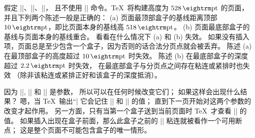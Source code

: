 \ddangerexercise 假定 |\vsize=528pt|、|\maxdepth=2.2pt|、|\topskip=10pt|，
且不使用 |\insert| 命令。\TeX\ 将构建高度为 $528\pt$ 的页面，
并且下列两个陈述一般是正确的：
(a) 页面最顶部盒子的基线距离顶部 $10\pt$，即比页面本身的基线高 $518\pt$。%
(b) 页面最底部盒子的基线与页面本身的基线重合。%
看看在什么情况下 (a) 和 (b) 失效。
\answer 如果没有插入项，页面总是至少包含一个盒子，因为否则的话合法分页点就会被丢弃。
陈述 (a) 在最顶部盒子的高度超过 $10\pt$ 时失效。
陈述 (b) 在最底部盒子的深度超过 $2.2\pt$ 时失效，
在最底部盒子与分页点之间存在粘连或紧排时也失效%
（除非该粘连或紧排正好和该盒子的深度抵消）。

\ddanger 因为 |\vsize|, |\maxdepth| 和 |\topskip| 是参数，
所以可以在任何时候改变它们；
如果这样会出现什么结果？
嗯，当 \TeX\ 输出``|%
它会记住 |\vsize| 和 |\maxdepth| 的值；
直到下一页开始对这两个参数的改变才起作用。%
另一方面，只有当第一个盒子送到当前页面时 \TeX\ 才查看 |\topskip| 的值。%
如果插入出现在盒子前面，那么此盒子之前的 |\topskip| 粘连就被看作一个可用断点；
这是整个页面不可能包含盒子的唯一情形。

